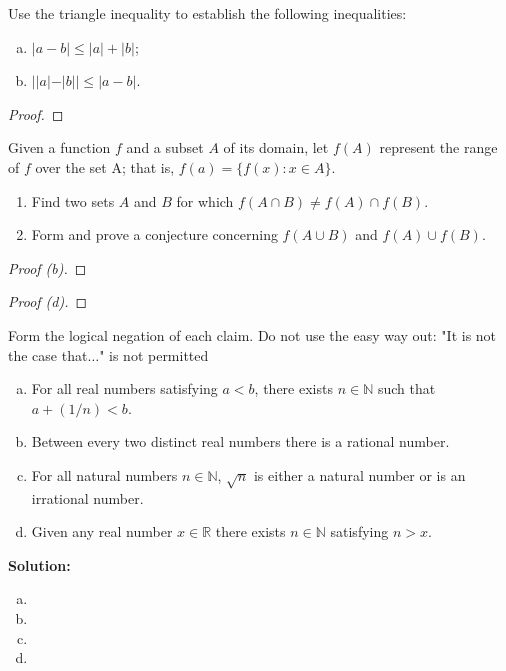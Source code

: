 \documentclass[12pt]{article}
\makeatletter
\theoremstyle{homework}
\newenvironment{exercise}[1]
{\def\@currentlabel{#1}\exercisecore}
{\endexercisecore}
\newcommand{\localhead}[1]{\par\smallskip\noindent\textbf{#1}\nobreak\\}%
\newcommand\solution{\localhead{Solution:}}
\newcommand{\Reals}{\ensuremath{\mathbb R}}
\newcommand{\Nats}{\ensuremath{\mathbb N}}
\makeatother
\begin{document}
\begin{exercise}{1.2.5}
Use the triangle inequality to establish the following inequalities:
\begin{enumerate}[(a)]
\item $|a-b| \le |a| + |b|$;
\item $||a|-|b|| \le |a-b|$.
\end{enumerate}
\end{exercise}
\begin{proof}
\end{proof}

\begin{exercise}{1.2.6(b), (d)}
Given a function $f$ and a subset $A$ of its domain, let $f(A)$ represent the range of $f$ over the set A;
that is, $f(a)=\{f(x):x\in A\}$.
\end{exercise}
\begin{enumerate}
\item[(b)] Find two sets $A$ and $B$ for which $f(A\cap B) \neq f(A)\cap f(B)$.
\item[(d)] Form and prove a conjecture concerning $f(A\cup B)$ and $f(A)\cup f(B)$.
\end{enumerate}
\begin{proof}[Proof (b)]
\end{proof}
\begin{proof}[Proof (d)]
\end{proof}

\begin{exercise}{1.2.8}
Form the logical negation of each claim. Do not use the easy way out: "It is not the case that$\ldots$" 
is not permitted
\begin{enumerate}[(a)]
\item For all real numbers satisfying $a<b$, there exists $n\in\Nats$ such that $a+(1/n)<b$.
\item Between every two distinct real numbers there is a rational number.
\item For all natural numbers $n\in\Nats$, $\sqrt{n}$ is either a natural number or is an
irrational number.
\item Given any real number $x\in\Reals$ there exists $n\in\Nats$ satisfying $n>x$.
\end{enumerate}
\end{exercise}
\solution
\begin{enumerate}[(a)]
\item 
\item 
\item 
\item 
\end{enumerate}
\end{document}
